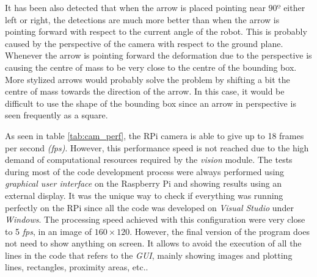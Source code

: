 It has been also detected that when the arrow is placed pointing near $90º$ either left or right, the detections are much more better than when the arrow is pointing forward with respect to the current angle of the robot. This is probably caused by the perspective of the camera with respect to the ground plane. Whenever the arrow is pointing forward the deformation due to the perspective is causing the centre of mass to be very close to the centre of the bounding box. More stylized arrows would probably solve the problem by shifting a bit the centre of mass towards the direction of the arrow. In this case, it would be difficult to use the shape of the bounding box since an arrow in perspective is seen frequently as a square.

As seen in table \ref{tab:cam_perf}, the RPi camera is able to give up to 18 frames per second \textit{(fps)}. However, this performance speed is not reached due to the high demand of computational resources required by the \textit{vision} module. The tests during most of the code development process were always performed using \textit{graphical user interface} on the Raspberry Pi and showing results using an external display. It was the unique way to check if everything was running perfectly on the RPi since all the code was developed on \textit{Visual Studio} under \textit{Windows}. The processing speed achieved with this configuration were very close to 5 \textit{fps}, in an image of $160\times120$. However, the final version of the program does not need to show anything on screen. It allows to avoid the execution of all the lines in the code that refers to the \textit{GUI}, mainly showing images and plotting lines, rectangles, proximity areas, etc..


